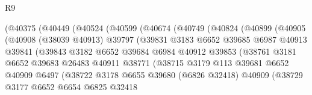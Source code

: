 \begin{lexlean}{R9}
\begin{coremodule}
                    (@40375
                      (@40449
                        (@40524
                          (@40599
                            (@40674
                              (@40749
                                (@40824
                                  (@40899
                                    (@40905
                                      (@40908
                                        (@38039 @40913)
                                        @39797
                                        (@39831
                                          @3183
                                          @6652
                                          @39685
                                          @6987
                                          @40913
                                          @39841
                                          (@39843
                                            @3182
                                            @6652
                                            @39684
                                            @6984
                                            @40912
                                            @39853
                                            (@38761
                                              @3181
                                              @6652
                                              @39683
                                              @26483
                                              @40911
                                              @38771
                                              (@38715
                                                @3179
                                                @113
                                                @39681
                                                @6652
                                                @40909
                                                @6497
                                                (@38722
                                                  @3178
                                                  @6655
                                                  @39680
                                                  (@6826 @32418)
                                                  @40909
                                                  (@38729
                                                    @3177
                                                    @6652
                                                    @6654
                                                    @6825
                                                    @32418

\end{coremodule}
\end{lexlean}
